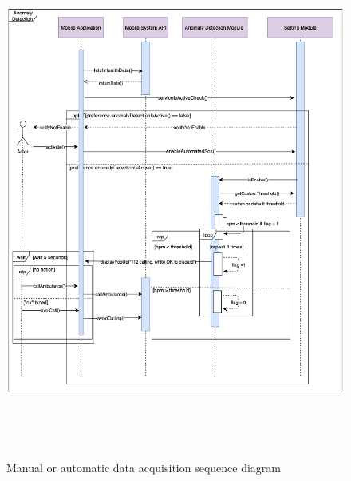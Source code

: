 \begin{figure}[h!]
\centering
\includegraphics[height=17.00cm,keepaspectratio]{Figures/AutomatedSOS}
\caption{Manual or automatic data acquisition sequence diagram}
\end{figure}
